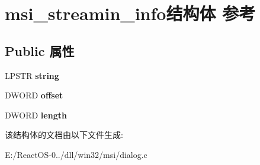 \hypertarget{structmsi__streamin__info}{}\section{msi\+\_\+streamin\+\_\+info结构体 参考}
\label{structmsi__streamin__info}
\subsection*{Public 属性}
\begin{DoxyCompactItemize}
\item 
\mbox{\label{structmsi__streamin__info_ade7db6ecfece8b388dbb4718d1e3113d}} 
L\+P\+S\+TR {\bfseries string}
\item 
\mbox{\label{structmsi__streamin__info_aefcbb9d8ccf9157192884d66de0c95b3}} 
D\+W\+O\+RD {\bfseries offset}
\item 
\mbox{\label{structmsi__streamin__info_a978b4965905b7a66f2c7e6a397584732}} 
D\+W\+O\+RD {\bfseries length}
\end{DoxyCompactItemize}


该结构体的文档由以下文件生成\+:\begin{DoxyCompactItemize}
\item 
E\+:/\+React\+O\+S-\/0../dll/win32/msi/dialog.\+c\end{DoxyCompactItemize}
